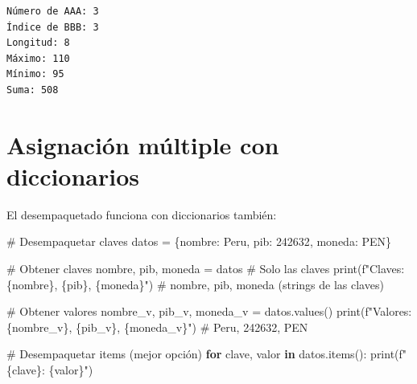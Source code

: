 \documentclass[
  doc,
  floatsintext,
  longtable,
  a4paper,
  nolmodern,
  notxfonts,
  notimes,
  12pt,
  colorlinks=true,linkcolor=blue,citecolor=blue,urlcolor=blue]{apa7}
\newenvironment{Shaded}{\begin{snugshade}}{\end{snugshade}}
\newcommand{\BuiltInTok}[1]{\textcolor[rgb]{0.00,0.23,0.31}{#1}}
\newcommand{\CommentTok}[1]{\textcolor[rgb]{0.37,0.37,0.37}{#1}}
\newcommand{\ControlFlowTok}[1]{\textcolor[rgb]{0.00,0.23,0.31}{\textbf{#1}}}
\newcommand{\DecValTok}[1]{\textcolor[rgb]{0.68,0.00,0.00}{#1}}
\newcommand{\KeywordTok}[1]{\textcolor[rgb]{0.00,0.23,0.31}{\textbf{#1}}}
\newcommand{\NormalTok}[1]{\textcolor[rgb]{0.00,0.23,0.31}{#1}}
\newcommand{\OperatorTok}[1]{\textcolor[rgb]{0.37,0.37,0.37}{#1}}
\newcommand{\SpecialCharTok}[1]{\textcolor[rgb]{0.37,0.37,0.37}{#1}}
\newcommand{\SpecialStringTok}[1]{\textcolor[rgb]{0.13,0.47,0.30}{#1}}
\newcommand{\StringTok}[1]{\textcolor[rgb]{0.13,0.47,0.30}{#1}}
\begin{document}
\begin{verbatim}
Número de AAA: 3
Índice de BBB: 3
Longitud: 8
Máximo: 110
Mínimo: 95
Suma: 508
\end{verbatim}

\section{Asignación múltiple con
diccionarios}\label{asignaciuxf3n-muxfaltiple-con-diccionarios}

El desempaquetado funciona con diccionarios también:

\begin{Shaded}
\begin{Highlighting}[]
\CommentTok{\# Desempaquetar claves}
\NormalTok{datos }\OperatorTok{=}\NormalTok{ \{}\StringTok{\textquotesingle{}nombre\textquotesingle{}}\NormalTok{: }\StringTok{\textquotesingle{}Peru\textquotesingle{}}\NormalTok{, }\StringTok{\textquotesingle{}pib\textquotesingle{}}\NormalTok{: }\DecValTok{242632}\NormalTok{, }\StringTok{\textquotesingle{}moneda\textquotesingle{}}\NormalTok{: }\StringTok{\textquotesingle{}PEN\textquotesingle{}}\NormalTok{\}}

\CommentTok{\# Obtener claves}
\NormalTok{nombre, pib, moneda }\OperatorTok{=}\NormalTok{ datos  }\CommentTok{\# Solo las claves}
\BuiltInTok{print}\NormalTok{(}\SpecialStringTok{f"Claves: }\SpecialCharTok{\{}\NormalTok{nombre}\SpecialCharTok{\}}\SpecialStringTok{, }\SpecialCharTok{\{}\NormalTok{pib}\SpecialCharTok{\}}\SpecialStringTok{, }\SpecialCharTok{\{}\NormalTok{moneda}\SpecialCharTok{\}}\SpecialStringTok{"}\NormalTok{)}
\CommentTok{\# nombre, pib, moneda (strings de las claves)}

\CommentTok{\# Obtener valores}
\NormalTok{nombre\_v, pib\_v, moneda\_v }\OperatorTok{=}\NormalTok{ datos.values()}
\BuiltInTok{print}\NormalTok{(}\SpecialStringTok{f"Valores: }\SpecialCharTok{\{}\NormalTok{nombre\_v}\SpecialCharTok{\}}\SpecialStringTok{, }\SpecialCharTok{\{}\NormalTok{pib\_v}\SpecialCharTok{\}}\SpecialStringTok{, }\SpecialCharTok{\{}\NormalTok{moneda\_v}\SpecialCharTok{\}}\SpecialStringTok{"}\NormalTok{)}
\CommentTok{\# Peru, 242632, PEN}

\CommentTok{\# Desempaquetar items (mejor opción)}
\ControlFlowTok{for}\NormalTok{ clave, valor }\KeywordTok{in}\NormalTok{ datos.items():}
    \BuiltInTok{print}\NormalTok{(}\SpecialStringTok{f"}\SpecialCharTok{\{}\NormalTok{clave}\SpecialCharTok{\}}\SpecialStringTok{: }\SpecialCharTok{\{}\NormalTok{valor}\SpecialCharTok{\}}\SpecialStringTok{"}\NormalTok{)}
\end{Highlighting}
\end{Shaded}
\end{document}
